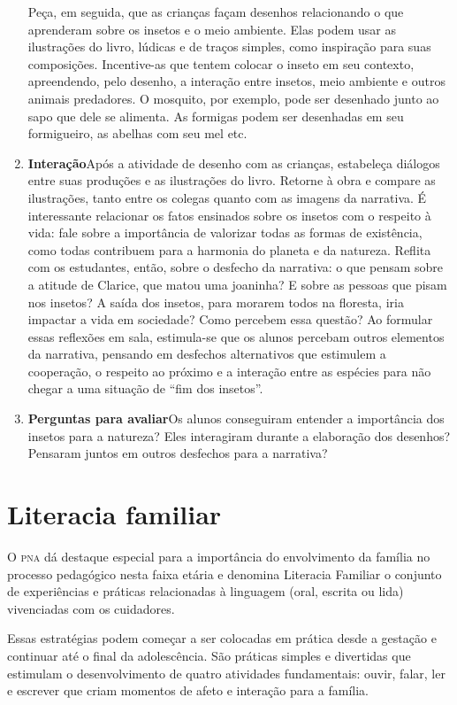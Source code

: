 \documentclass[11pt]{extarticle}
\begin{document}
\begin{enumerate}
Peça, em seguida, que as crianças façam desenhos relacionando o que aprenderam sobre os insetos e o meio ambiente. Elas podem usar as ilustrações do livro, lúdicas e de traços simples, como inspiração para suas composições. Incentive-as que tentem colocar o inseto em seu contexto, apreendendo, pelo desenho, a interação entre insetos, meio ambiente e outros animais predadores. O mosquito, por exemplo, pode ser desenhado junto ao sapo que dele se alimenta. As formigas podem ser desenhadas em seu formigueiro, as abelhas com seu mel etc.

\item \textbf{Interação}\quad Após a atividade de desenho com as crianças, estabeleça diálogos entre suas produções e as ilustrações do livro. Retorne à obra e compare as ilustrações, tanto entre os colegas quanto com as imagens da narrativa. É interessante relacionar os fatos ensinados sobre os insetos com o respeito à vida: fale sobre a importância de valorizar todas as formas de existência, como todas contribuem para a harmonia do planeta e da natureza. Reflita com os estudantes, então, sobre o desfecho da narrativa: o que pensam sobre a atitude de Clarice, que matou uma joaninha? E sobre as pessoas que pisam nos insetos? A saída dos insetos, para morarem todos na floresta, iria impactar a vida em sociedade? Como percebem essa questão? Ao formular essas reflexões em sala, estimula-se que os alunos percebam outros elementos da narrativa, pensando em desfechos alternativos que estimulem a cooperação, o respeito ao próximo e a interação entre as espécies para não chegar a uma situação de ``fim dos insetos''.

\item \textbf{Perguntas para avaliar}\quad Os alunos conseguiram
entender a importância dos insetos para a natureza? Eles interagiram durante a elaboração dos desenhos? Pensaram juntos em outros desfechos para a narrativa? 
\end{enumerate}


\section{Literacia familiar}
O \textsc{pna} dá destaque especial para a importância do envolvimento da família 
no processo pedagógico nesta faixa etária e denomina Literacia Familiar o conjunto 
de experiências e práticas relacionadas à linguagem (oral, escrita ou lida) vivenciadas 
com os cuidadores. 

Essas estratégias podem começar a ser colocadas em prática desde a 
gestação e continuar até o final da adolescência. São práticas simples e divertidas 
que estimulam o desenvolvimento de quatro atividades fundamentais: ouvir, falar, 
ler e escrever que criam momentos de afeto e interação para a família. 
\end{document}
